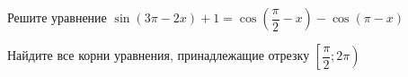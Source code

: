 \begin{ex}
	\begin{condition}
		\begin{enumcols}[label=\asbuk*)]
			\item Решите уравнение \( \sin{(3\pi -2 x)} + 1 = \cos {\left(\dfrac{\pi }{2} - x\right)} - \cos {(\pi - x)} \)
			\item Найдите все корни уравнения, принадлежащие отрезку \( \left[\dfrac{\pi}{2};2\pi\right) \)
		\end{enumcols}
	\end{condition}
\end{ex}